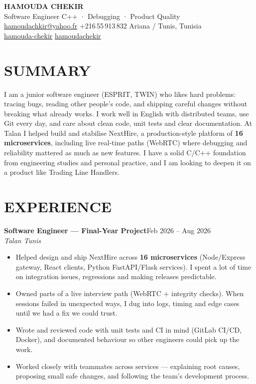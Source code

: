 \documentclass[10pt,a4paper]{article}
\newcommand{\TargetTitle}{Software Engineer \textbar{} C++ · Debugging · Product Quality}
\newcommand{\job}[3]{%
  \textbf{\color{primary}#1}\hfill{\color{muted}\small #2}\\[-1pt]
  {\color{accent}\textit{#3}}\\[2pt]
  \begin{itemize}[leftmargin=0.85em, itemsep=1pt, topsep=0pt, parsep=0pt, partopsep=0pt]
}
\newcommand{\contactsep}{\hspace{5pt}{\color{rulecolor}|}\hspace{5pt}}
\begin{document}
{\fontsize{22}{26}\selectfont\bfseries\color{primary}HAMOUDA CHEKIR}\\[2pt]
{\large\color{accent}\TargetTitle}\\[4pt]
{\footnotesize\color{muted}%
  \hspace{3pt}\href{mailto:hamoudachkir@yahoo.fr}{hamoudachkir@yahoo.fr}%
  \contactsep
  \hspace{3pt}+216\,55\,913\,832%
  \contactsep
  \hspace{3pt}Ariana / Tunis, Tunisia%
}\\[2pt]
{\footnotesize\color{muted}%
  \hspace{3pt}\href{https://www.linkedin.com/in/hamouda-chekir-5053572b4}{hamouda-chekir}%
  \contactsep
  \hspace{3pt}\href{https://github.com/hamoudachekir}{hamoudachekir}%
}\\[6pt]

\section{SUMMARY}
I am a junior software engineer (ESPRIT, TWIN) who likes hard problems: tracing bugs, reading other people's code, and shipping careful changes without breaking what already works.
I work well in English with distributed teams, use Git every day, and care about clean code, unit tests and clear documentation.
At Talan I helped build and stabilise NextHire, a production-style platform of \textbf{16 microservices}, including live real-time paths (WebRTC) where debugging and reliability mattered as much as new features.
I have a solid C/C++ foundation from engineering studies and personal practice, and I am looking to deepen it on a product like Trading Line Handlers.

\section{EXPERIENCE}

\job{Software Engineer — Final-Year Project}{Feb 2026 -- Aug 2026}{Talan \textbar{} Tunis}
  \item Helped design and ship NextHire across \textbf{16 microservices} (Node/Express gateway, React clients, Python FastAPI/Flask services). I spent a lot of time on integration issues, regressions and making releases predictable.
  \item Owned parts of a live interview path (WebRTC + integrity checks). When sessions failed in unexpected ways, I dug into logs, timing and edge cases until we had a fix we could trust.
  \item Wrote and reviewed code with unit tests and CI in mind (GitLab CI/CD, Docker), and documented behaviour so other engineers could pick up the work.
  \item Worked closely with teammates across services — explaining root causes, proposing small safe changes, and following the team's development process.
\end{itemize}
\end{document}
